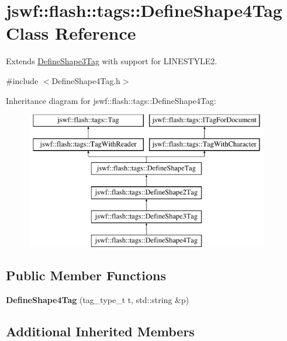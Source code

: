 \hypertarget{classjswf_1_1flash_1_1tags_1_1_define_shape4_tag}{\section{jswf\+:\+:flash\+:\+:tags\+:\+:Define\+Shape4\+Tag Class Reference}
\label{classjswf_1_1flash_1_1tags_1_1_define_shape4_tag}
}


Extends \hyperlink{classjswf_1_1flash_1_1tags_1_1_define_shape3_tag}{Define\+Shape3\+Tag} with support for {\ttfamily L\+I\+N\+E\+S\+T\+Y\+L\+E2}.  




{\ttfamily \#include $<$Define\+Shape4\+Tag.\+h$>$}

Inheritance diagram for jswf\+:\+:flash\+:\+:tags\+:\+:Define\+Shape4\+Tag\+:\begin{figure}[H]
\begin{center}
\leavevmode
\includegraphics[height=6.000000cm]{classjswf_1_1flash_1_1tags_1_1_define_shape4_tag}
\end{center}
\end{figure}
\subsection*{Public Member Functions}
\begin{DoxyCompactItemize}
\item 
\hypertarget{classjswf_1_1flash_1_1tags_1_1_define_shape4_tag_a565066d2321f8567bb7930c5cb5b1c8e}{{\bfseries Define\+Shape4\+Tag} (tag\+\_\+type\+\_\+t t, std\+::string \&p)}\label{classjswf_1_1flash_1_1tags_1_1_define_shape4_tag_a565066d2321f8567bb7930c5cb5b1c8e}

\end{DoxyCompactItemize}
\subsection*{Additional Inherited Members}


